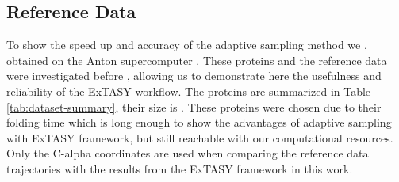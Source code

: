 \subsection{\label{sec:Reference} Reference Data}

\begin{table}[h!]
\centering
\caption{Adaptively sampled proteins in this study}
\label{tab:dataset-summary}
\end{table}
To show the speed up and accuracy of the adaptive sampling method we , obtained
on the Anton supercomputer \cite{lindorff2011}. These proteins and the
reference data were investigated before \cite{reanalyze1, reanalyze2},
allowing us to demonstrate here the usefulness and reliability of the ExTASY
workflow. The  proteins are summarized in Table \ref{tab:dataset-summary},
their size is .
These proteins were chosen due to their folding time which is long enough to
show the advantages of adaptive sampling with ExTASY framework, but still
reachable with our computational resources. Only the C-alpha coordinates are
used when comparing the reference data trajectories with the results from the
ExTASY framework in this work. 



